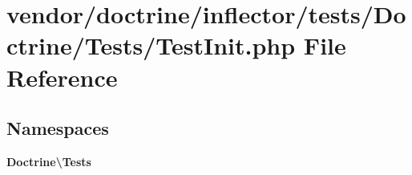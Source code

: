 \section{vendor/doctrine/inflector/tests/\+Doctrine/\+Tests/\+Test\+Init.php File Reference}
\label{_test_init_8php}
\subsection*{Namespaces}
\begin{DoxyCompactItemize}
\item 
 {\bf Doctrine\textbackslash{}\+Tests}
\end{DoxyCompactItemize}
